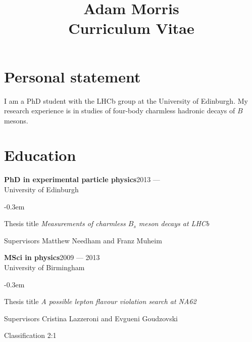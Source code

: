 \documentclass[contbibnum]{simplecv}
\title{Adam Morris\\{\large Curriculum Vitae}}
\newcommand\dateditem[2]{#1\hfill#2\\}
\newcommand\topictitle[3]{\dateditem{{\textbf{#1}}}{#3}#2}
\def\typeface{phv}
\begin{document}
	\maketitle\vspace{-2em}
	\fontfamily{\typeface}\selectfont
	\section{Personal statement}
	I am a PhD student with the LHCb group at the University of Edinburgh.
	My research experience is in studies of four-body charmless hadronic decays of $B$ mesons.
	
	
	\section{Education}
	\topictitle{PhD in experimental particle physics}{University of Edinburgh}{2013 ---}
	\begin{topic}
		\itemsep-0.3em
		\item[Thesis title]{\textit{Measurements of charmless $B_s$ meson decays at LHCb}}
		\item[Supervisors]{Matthew Needham and Franz Muheim}
	\end{topic}
	\topictitle{MSci in physics}{University of Birmingham}{2009 --- 2013}
	\begin{topic}
		\itemsep-0.3em
		\item[Thesis title]{\textit{A possible lepton flavour violation search at NA62}}
		\item[Supervisors]{Cristina Lazzeroni and Evgueni Goudzovski}
		\item[Classification]{2:1}
	\end{topic}
\end{document}
